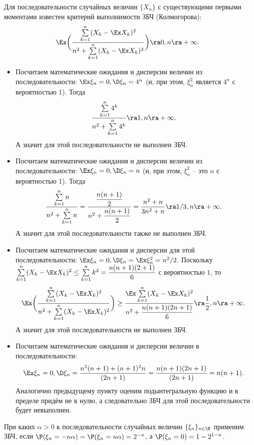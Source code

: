 \begin{solution}
    Для последовательности случайных величин $\{X_n\}$ с существующими первыми моментами известен критерий выполнимости ЗБЧ (Колмогорова):
    \[
        \Ex\biggr(\dfrac{\sum\limits_{k = 1}^{n}(X_k - \Ex X_k)^2}{n^2 + \sum\limits_{k = 1}^n(X_k - \Ex X_k)^2}\biggr) \ra 0, n \ra +\infty.
    \]
    \begin{itemize}
        \item Посчитаем математические ожидания и дисперсии величин из последовательности: $\Ex \xi_n = 0, \D \xi_n = 4^n$ (и, при этом, $\xi_n^2$ является $4^n$ с вероятностью 1).
        Тогда
        \[
            \dfrac{\sum\limits_{k = 1}^n 4^k}{n^2 + \sum\limits_{k = 1}^{n}4^k} \ra 1, n \ra +\infty.
        \]
        А значит для этой последовательности не выполнен ЗБЧ.
        \item Посчитаем математические ожидания и дисперсии величин из последовательности: $\Ex \xi_n = 0, \D \xi_n = n$ (и, при этом, $\xi_n^2$ -- это $n$ с вероятностью 1).
        Тогда
        \[
            \dfrac{\sum\limits_{k = 1}^n n}{n^2 + \sum\limits_{k = 1}^n n} = \dfrac{\dfrac{n(n + 1)}{2}}{n^2 + \dfrac{n(n + 1)}{2}} = \dfrac{n^2 + n}{3n^2 + n} \ra 1/3, n \ra +\infty.
        \]
        А значит для этой последовательности также не выполнен ЗБЧ.
        \item Посчитаем математические ожидания и дисперсии для этой последовательности: $\Ex \xi_n = 0, \D \xi_n = \Ex \xi_n^2 = n^2/2$.
        Поскольку $\sum\limits_{k = 1}^n (X_k - \Ex X_k)^2 \leq \sum\limits_{k = 1}^{n}k^2 = \dfrac{n(n + 1)(2 + 1)}{6}$ с вероятностью $1$, то
        \[
            \Ex \biggr(\dfrac{\sum\limits_{k = 1}^n (X_k - \Ex X_k)^2}{n^2 + \sum\limits_{k = 1}^{n} (X_k - \Ex X_k)^2} \biggr) \geq \dfrac{\Ex \sum\limits_{k = 1}^n (X_k - \Ex X_k)^2}{n^2 + \dfrac{n(n + 1)(2n + 1)}{6}} \ra \dfrac{1}{2}, n \ra +\infty.
        \]
        А значит для этой последовательности не выполнен ЗБЧ.
        \item Посчитаем математические ожидания и дисперсии величин в последовательности:
        \[\Ex \xi_n = 0, \D \xi_n = \dfrac{n^2(n + 1) + (n + 1)^2 n}{(2n + 1)} = \dfrac{n(n + 1)(2n + 1)}{(2n + 1)} = n(n + 1).\]
         Аналогично предыдущему пункту оценим подынтегральную функцию и в пределе придём не к нулю, а следовательно ЗБЧ для этой последовательности будет невыполнен.
    \end{itemize}
\end{solution}
\begin{problem}
    При каких $\alpha > 0$ к последовательности случайных величин $\{\xi_n\}_{n \in \N}$ применим ЗБЧ, если $\P(\xi_n = -n\alpha) = \P(\xi_n = n \alpha) = 2^{-n}$, а $\P(\xi_n = 0) = 1 - 2^{1 - n}$.
\end{problem}
